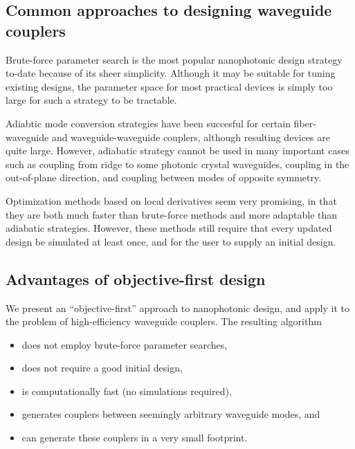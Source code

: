 \documentclass[letterpaper,10pt]{article}
\begin{document}
\subsection{Common approaches to designing waveguide couplers}
Brute-force parameter search is the most popular nanophotonic design strategy 
    to-date because of its sheer simplicity\cite{}.
Although it may be suitable for tuning existing designs\cite{},
    the parameter space for most practical devices is simply too large
    for such a strategy to be tractable.

Adiabtic mode conversion strategies have been succesful
    for certain fiber-waveguide\cite{} and waveguide-waveguide\cite{} couplers,
    although resulting devices are quite large.
However, adiabatic strategy cannot be used in many important cases such as
    coupling from ridge to some photonic crystal waveguides,
    coupling in the out-of-plane direction, and
    coupling between modes of opposite symmetry.

Optimization methods based on local derivatives seem very promising\cite{},
    in that they are both much faster than brute-force methods and
    more adaptable than adiabatic strategies.
However, these methods still require that every updated design be simulated
    at least once,
    and for the user to supply an initial design.


\subsection{Advantages of objective-first design}
We present an ``objective-first'' approach to nanophotonic design, 
    and apply it to the problem of high-efficiency waveguide couplers.
The resulting algorithm
\begin{itemize}
    \item does not employ brute-force parameter searches,
    \item does not require a good initial design,
    \item is computationally fast (no simulations required),
    \item generates couplers between seemingly arbitrary waveguide modes, and
    \item can generate these couplers in a very small footprint. 
\end{itemize}
\end{document}
